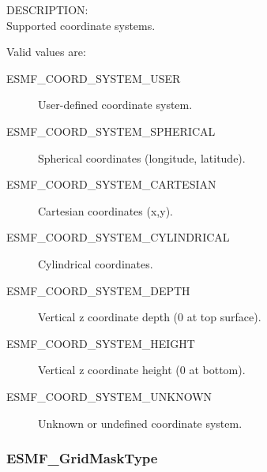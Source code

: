 {\sf DESCRIPTION:\\}
Supported coordinate systems.

Valid values are:
\begin{description}
   \item [ESMF\_COORD\_SYSTEM\_USER]
         User-defined coordinate system.

   \item [ESMF\_COORD\_SYSTEM\_SPHERICAL]
         Spherical coordinates (longitude, latitude).

   \item [ESMF\_COORD\_SYSTEM\_CARTESIAN]
         Cartesian coordinates (x,y).

   \item [ESMF\_COORD\_SYSTEM\_CYLINDRICAL] 
         Cylindrical coordinates.

   \item [ESMF\_COORD\_SYSTEM\_DEPTH]
         Vertical z coordinate depth (0 at top surface).

   \item [ESMF\_COORD\_SYSTEM\_HEIGHT]
         Vertical z coordinate height (0 at bottom).

   \item [ESMF\_COORD\_SYSTEM\_UNKNOWN]
         Unknown or undefined coordinate system.
\end{description}

\subsubsection{ESMF\_GridMaskType}

